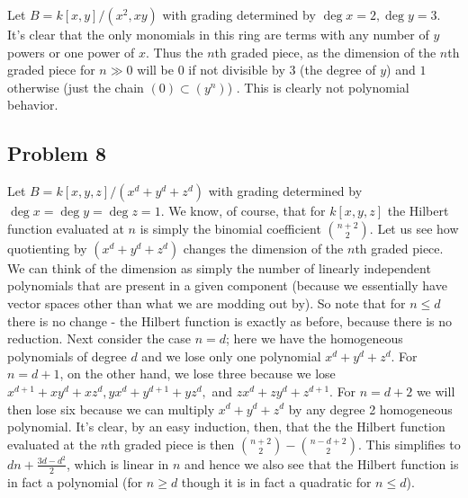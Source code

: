 \documentclass{../../mathnotes}
\begin{document}
Let $B=k[x,y]/(x^2,xy)$ with grading determined by $\deg x=2,\deg y=3$. It's clear that the only monomials in this ring
are terms with any number of $y$ powers or one power of $x$. Thus the $n$th graded piece, as the dimension of the $n$th graded piece for $n\gg 0$ will be 0 if not divisible by
3 (the degree of $y$) and $1$ otherwise (just the chain $(0)\subset (y^n)$) . This is clearly not polynomial behavior.

\subsection*{Problem 8}

Let $B=k[x,y,z]/(x^d+y^d+z^d)$ with grading determined by $\deg x=\deg y=\deg z=1$. We know, of course, that for $k[x,y,z]$ the Hilbert function evaluated at $n$
is simply the binomial coefficient $\binom{n+2}{2}$. Let us see how quotienting by $(x^d+y^d+z^d)$ changes the dimension of the $n$th graded piece. 
We can think of the dimension as simply the number of linearly independent polynomials that are present in a given component (because we essentially have
vector spaces other than what we are modding out by).
So note that for $n\leq d$ there is no change - the Hilbert function is exactly as before, because there is no reduction. Next consider the case $n=d$; here we have
the homogeneous polynomials of degree $d$ and we lose only one polynomial $x^d+y^d+z^d$. For $n=d+1$, on the other hand, we lose three because we lose
$x^{d+1}+xy^{d}+xz^{d},yx^d+y^{d+1}+yz^d,$ and $zx^d+zy^d+z^{d+1}$. For $n=d+2$ we will then lose six because we can multiply $x^d+y^d+z^d$ by any degree 2 homogeneous polynomial.
It's clear, by an easy induction, then, that the the Hilbert function evaluated at the $n$th graded piece is then $\binom{n+2}{2}-\binom{n-d+2}{2}$. This simplifies to
$dn+\frac{3d-d^2}{2}$, which is linear in $n$ and hence we also see that the Hilbert function is in fact a polynomial (for $n\geq d$ though it is in fact a quadratic
for $n\leq d$).
\end{document}
